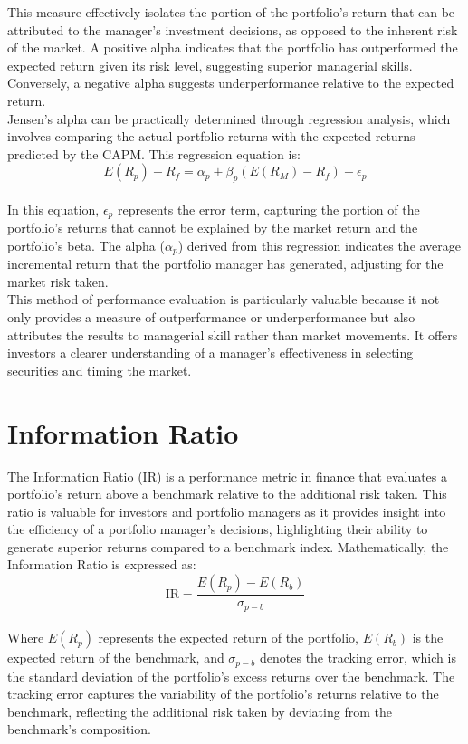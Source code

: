 \documentclass[a4paper,10pt]{article}
\begin{document}
\noindent This measure effectively isolates the portion of the portfolio's return that can be attributed to the manager's investment decisions, as opposed to the inherent risk of the market. A positive alpha indicates that the portfolio has outperformed the expected return given its risk level, suggesting superior managerial skills. Conversely, a negative alpha suggests underperformance relative to the expected return. \\

\noindent Jensen's alpha can be practically determined through regression analysis, which involves comparing the actual portfolio returns with the expected returns predicted by the CAPM. This regression equation is: \\
\[
E(R_p) - R_f = \alpha_p + \beta_p \left( E(R_M) - R_f \right) + \epsilon_p
\] \\
\noindent In this equation, \( \epsilon_p \) represents the error term, capturing the portion of the portfolio's returns that cannot be explained by the market return and the portfolio's beta. The alpha (\(\alpha_p\)) derived from this regression indicates the average incremental return that the portfolio manager has generated, adjusting for the market risk taken. \\

\noindent This method of performance evaluation is particularly valuable because it not only provides a measure of outperformance or underperformance but also attributes the results to managerial skill rather than market movements. It offers investors a clearer understanding of a manager's effectiveness in selecting securities and timing the market.  \\

\section*{Information Ratio}

\noindent The Information Ratio (IR) is a performance metric in finance that evaluates a portfolio's return above a benchmark relative to the additional risk taken. This ratio is valuable for investors and portfolio managers as it provides insight into the efficiency of a portfolio manager's decisions, highlighting their ability to generate superior returns compared to a benchmark index. Mathematically, the Information Ratio is expressed as: \\
\[
\text{IR} = \frac{E(R_p) - E(R_b)}{\sigma_{p-b}}
\] \\
\noindent Where \(E(R_p)\) represents the expected return of the portfolio, \(E(R_b)\) is the expected return of the benchmark, and \(\sigma_{p-b}\) denotes the tracking error, which is the standard deviation of the portfolio's excess returns over the benchmark. The tracking error captures the variability of the portfolio's returns relative to the benchmark, reflecting the additional risk taken by deviating from the benchmark's composition. \\
\end{document}
